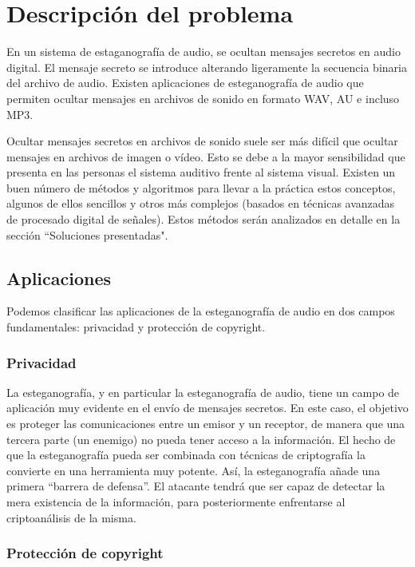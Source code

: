 \documentclass[12pt]{article}
\begin{document}
\newpage
\section{Descripción del problema}

En un sistema de estaganografía de audio, se ocultan mensajes secretos en audio digital. El mensaje secreto se introduce alterando ligeramente la secuencia binaria del archivo de audio. Existen aplicaciones de esteganografía de audio que permiten ocultar mensajes en archivos de sonido en formato WAV, AU e incluso MP3.

Ocultar mensajes secretos en archivos de sonido suele ser más difícil que ocultar mensajes en archivos de imagen o vídeo. Esto se debe a la mayor sensibilidad que presenta en las personas el sistema auditivo frente al sistema visual. Existen un buen número de métodos y algoritmos para llevar a la práctica estos conceptos, algunos de ellos sencillos y otros más complejos (basados en técnicas avanzadas de procesado digital de señales). Estos métodos serán analizados en detalle en la sección ``Soluciones presentadas".

\subsection{Aplicaciones}

Podemos clasificar las aplicaciones de la esteganografía de audio en dos campos fundamentales: privacidad y protección de copyright.

\subsubsection{Privacidad}

La esteganografía, y en particular la esteganografía de audio, tiene un campo de aplicación muy evidente en el envío de mensajes secretos. En este caso, el objetivo es proteger las comunicaciones entre un emisor y un receptor, de manera que una tercera parte (un enemigo) no pueda tener acceso a la información. El hecho de que la esteganografía pueda ser combinada con técnicas de criptografía la convierte en una herramienta muy potente. Así, la esteganografía añade una primera ``barrera de defensa''. El atacante tendrá que ser capaz de detectar la mera existencia de la información, para posteriormente enfrentarse al criptoanálisis de la misma.

\subsubsection{Protección de copyright}
\end{document}
